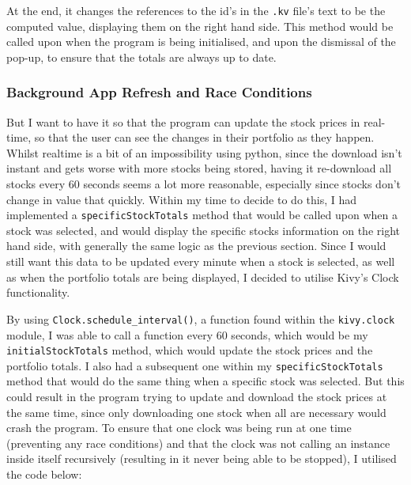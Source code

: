 \documentclass{article}
\begin{document}
\vspace{0.3cm}
At the end, it changes the references to the id's in the \texttt{.kv} file's text to be the computed value, displaying them on the right hand side. This method would be called upon when the program is being initialised, and upon the dismissal of the pop-up, to ensure that the totals are always up to date.\\\vspace{0.3cm}

\subsubsection{Background App Refresh and Race Conditions}
But I want to have it so that the program can update the stock prices in real-time, so that the user can see the changes in their portfolio as they happen. Whilst realtime is a bit of an impossibility using python, since the download isn't instant and gets worse with more stocks being stored, having it re-download all stocks every 60 seconds seems a lot more reasonable, especially since stocks don't change in value that quickly. Within my time to decide to do this, I had implemented a \texttt{specificStockTotals} method that would be called upon when a stock was selected, and would display the specific stocks information on the right hand side, with generally the same logic as the previous section. Since I would still want this data to be updated every minute when a stock is selected, as well as when the portfolio totals are being displayed, I decided to utilise Kivy's Clock functionality.\\\vspace{0.3cm}

By using \texttt{Clock.schedule\_interval()}, a function found within the \texttt{kivy.clock} module, I was able to call a function every 60 seconds, which would be my \texttt{initialStockTotals} method, which would update the stock prices and the portfolio totals. I also had a subsequent one within my \texttt{specificStockTotals} method that would do the same thing when a specific stock was selected. But this could result in the program trying to update and download the stock prices at the same time, since only downloading one stock when all are necessary would crash the program. To ensure that one clock was being run at one time (preventing any race conditions) and that the clock was not calling an instance inside itself recursively (resulting in it never being able to be stopped), I utilised the code below: \\\vspace{0.3cm}
\end{document}
